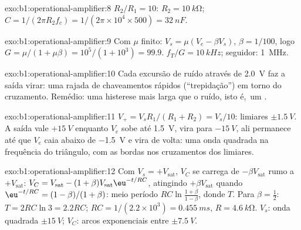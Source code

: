 \begin{solution}{exo:b1:operational-amplifier:8}
$R_2/R_1 = 10$: $R_2 = \qty{10}{k\ohm}$; $C = 1/(2\pi R_2f_c) = 1/(2\pi
\times 10^4 \times 500) = \qty{32}{nF}$.
\end{solution}

\begin{solution}{exo:b1:operational-amplifier:9}
Com $\mu$ finito: $V_s = \mu(V_e - \beta V_s)$, $\beta = 1/100$, logo
$G = \mu/(1 + \mu\beta) = 10^5/(1 + 10^3) = 99.9$.  $f_T/G =
\qty{10}{kHz}$; seguidor: \qty{1}{MHz}.
\end{solution}

\begin{solution}{exo:b1:operational-amplifier:10}
Cada excursão de ruído através de \qty{2.0}{V} faz a saída virar: uma rajada de
chaveamentos rápidos (``trepidação'') em torno do cruzamento. Remédio: uma histerese
mais larga que o ruído, isto é,\ um .
\end{solution}

\begin{solution}{exo:b1:operational-amplifier:11}
$V_+ = V_sR_1/(R_1 + R_2) = V_s/10$: limiares $\pm\qty{1.5}{V}$. A
saída vale $+\qty{15}{V}$ enquanto $V_e$ sobe até \qty{1.5}{V}, vira para
$-\qty{15}{V}$, ali permanece até que $V_e$ caia abaixo de \qty{-1.5}{V} e vira
de volta: uma onda quadrada na frequência do triângulo, com as bordas nos
cruzamentos dos limiares.
\end{solution}

\begin{solution}{exo:b1:operational-amplifier:12}
Com $V_s = +V_{\mathrm{sat}}$, $V_C$ se carrega de $-\beta V_{\mathrm{sat}}$
rumo a $+V_{\mathrm{sat}}$: $V_C = V_{\mathrm{sat}} - (1 + \beta)V_{\mathrm{sat}}
\eu^{-t/RC}$, atingindo $+\beta V_{\mathrm{sat}}$ quando $\eu^{-t/RC} =
(1 - \beta)/(1 + \beta)$: meio período $RC\ln\frac{1 + \beta}{1 - \beta}$,
donde $T$. Para $\beta = \tfrac12$: $T = 2RC\ln 3 = 2.2RC$; $RC = 1/(2.2 \times
10^3) = \qty{0.455}{ms}$, $R = \qty{4.6}{k\ohm}$. $V_s$: onda quadrada
$\pm\qty{15}{V}$; $V_C$: arcos exponenciais entre $\pm\qty{7.5}{V}$.
\end{solution}

